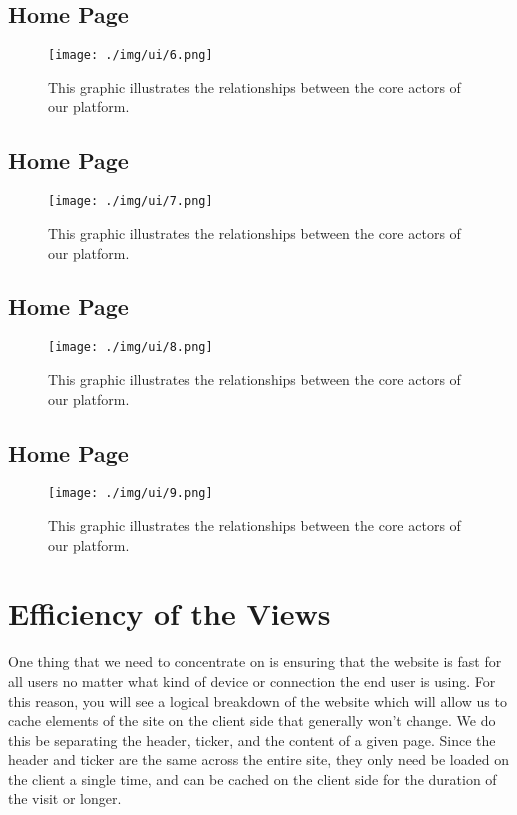 \subsection{Home Page}
\begin{figure}[H]
\centering
\texttt{[image: ./img/ui/6.png]}
\caption{This graphic illustrates the relationships between the core actors of our platform.}
\end{figure}

\subsection{Home Page}
\begin{figure}[H]
\centering
\texttt{[image: ./img/ui/7.png]}
\caption{This graphic illustrates the relationships between the core actors of our platform.}
\end{figure}

\subsection{Home Page}
\begin{figure}[H]
\centering
\texttt{[image: ./img/ui/8.png]}
\caption{This graphic illustrates the relationships between the core actors of our platform.}
\end{figure}

\subsection{Home Page}
\begin{figure}[H]
\centering
\texttt{[image: ./img/ui/9.png]}
\caption{This graphic illustrates the relationships between the core actors of our platform.}
\end{figure}


\section{Efficiency of the Views}

One thing that we need to concentrate on is ensuring that the website is fast
for all users no matter what kind of device or connection the end user is using.
For this reason, you will see a logical breakdown of the website which will
allow us to cache elements of the site on the client side that generally won't
change.  We do this be separating the header, ticker, and the content of a given
page.  Since the header and ticker are the same across the entire site, they
only need be loaded on the client a single time, and can be cached on the client
side for the duration of the visit or longer.\\

